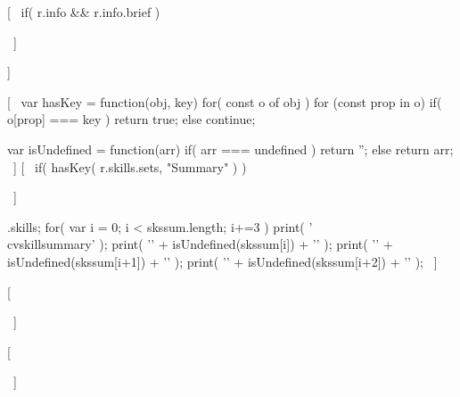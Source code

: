 [~ if( r.info && r.info.brief ) { ~]


\begin{cvparagraph}
  [[ r.info.brief ]]
\end{cvparagraph}

[~  
  var hasKey = function(obj, key){
    for( const o of obj ){
      for (const prop in o){
        if( o[prop] === key ){ return true; }else{ continue; }}}}

  var isUndefined = function(arr){
    if( arr === undefined ){
      return '';
    }
    else{ return arr; }
  }
~]
[~ if( hasKey( r.skills.sets, "Summary" ) ){ ~]
\begin{cvskillsetsummary}
  [~
    var skssum = r.skills.sets[0].skills;
    for( var i = 0; i < skssum.length; i+=3 ){
      print( '\\cvskillsummary' );
      print( '{' + isUndefined(skssum[i]) + '}' );
      print( '{' + isUndefined(skssum[i+1]) + '}' );
      print( '{' + isUndefined(skssum[i+2]) + '}\n\n' );
  }
  ~]
\end{cvskillsetsummary}
[~ } ~]

[~ } ~]
